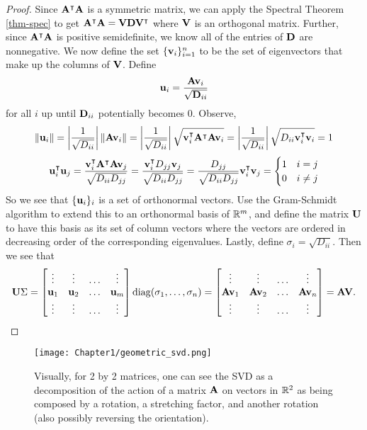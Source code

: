 \begin{proof}
Since $\MA^\intercal\MA $ is a symmetric matrix, we can apply the Spectral Theorem \ref{thm-spec} to get 
$\MA^\intercal \MA = \MV \MD \MV^\intercal$ where $\MV$ is an orthogonal matrix.
Further, since $\MA^\intercal\MA$ is positive semidefinite, we know all of the entries of $\MD$ are nonnegative. 
We now define the set $\{\vv_i\}_{i = 1}^n$ to be the set of eigenvectors that make up the columns of $\MV$. Define 
$$\vu_i = \frac{\MA \vv_i}{\sqrt{\MD_{ii}}}$$
for all $i$ up until $\MD_{ii}$ potentially becomes $0$.
Observe, 
$$\norm{\vu_i} =\left  |\frac{1}{\sqrt{D_{ii}}} \right | \norm{\MA\vv_i} =   \left |\frac{1}{\sqrt{D_{ii}}} \right | \sqrt{\vv_i^\intercal \MA^\intercal \MA \vv_i} = \left  |\frac{1}{\sqrt{D_{ii}}} \right| \sqrt{D_{ii} \vv_i^\intercal \vv_i} = 1$$
$$\vu_i^\intercal \vu_j =\frac{\vv_i^\intercal \MA^\intercal \MA \vv_j}{\sqrt{D_{ii} D_{jj}}} = \frac{\vv_i^\intercal D_{jj} \vv_j}{\sqrt{D_{ii} D_{jj}}} =  \frac{D_{jj}}{\sqrt{D_{ii} D_{jj}}} \vv_i^\intercal \vv_j = \begin{cases}
1 & i = j \\
0 & i \not = j
\end{cases}$$
So we see that $\{\vu_i\}_i$ is a set of orthonormal vectors. Use the Gram-Schmidt algorithm to extend this to an orthonormal basis of $\R^m$, and define the matrix $\MU$ to have this basis as its set of column vectors where the vectors are ordered in decreasing order of the corresponding eigenvalues.
Lastly, define 
$\sigma_i  = \sqrt{D_{ii}}$.
Then we see that 
$$\MU\Sigma = \begin{bmatrix}
\vdots & \vdots & \ldots & \vdots \\
\vu_1 & \vu_2 & \ldots & \vu_m \\
\vdots & \vdots & \ldots & \vdots
\end{bmatrix} \diag(\sigma_1,\dots,\sigma_n)= \begin{bmatrix}
\vdots & \vdots & \ldots & \vdots \\
\MA \vv_1 & \MA \vv_2 & \ldots & \MA \vv_n \\
\vdots & \vdots & \ldots & \vdots
\end{bmatrix}
= \MA\MV.$$
\end{proof}


 
 \begin{figure}
 \centering
  \texttt{[image: Chapter1/geometric\_svd.png]}
  \caption{ Visually, for 2 by 2 matrices, one can see the SVD as a decomposition of the action of a matrix $\MA$ on vectors in $\R^2$ as being composed by a rotation, a stretching factor, and another rotation (also possibly reversing the orientation).}
\end{figure}

